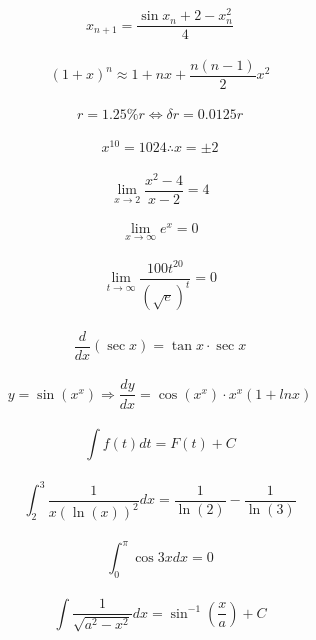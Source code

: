 \documentclass{article} \usepackage{amsmath} \usepackage{amssymb}
\newcommand{\fk}{\frac}
\begin{document}
 
\[x_{n+1}= \frac{\sin x_n + 2 - x_{n}^{2}}{4}\]\\
\[ (1+x)^n\approx1+nx+\frac{n(n-1)}{2}x^2\]\\
\[ r=1.25\%r\Leftrightarrow \delta r = 0.0125r\]\\
\[  x^{10}=1024\therefore x = \pm 2\]\\
\[ \lim_{x\to 2} \fk{x^2-4}{x-2}=4 \]\\
\[ \lim_{x\to \infty} e^x=0\]\\
\[ \lim_{t\to \infty} \frac{100t^{20}}{(\sqrt{e})^t}=0\]\\
\[ \fk{d}{dx}(\sec x)= \tan x \cdot \sec x\]\\
\[ y = \sin (x^x)\Rightarrow \fk{dy}{dx}= \cos (x^x) \cdot x^x (1+ln x)\]\\
\[ \int f(t)dt = F(t) + C\]\\
\[ \int_2^3    \fk{1}{x(\ln(x))^2}dx=\fk{1}{\ln(2)}-\fk{1}{\ln(3)} \]\\
\[ \int_0^\pi \cos 3xdx = 0\]\\
\[ \int \fk{1}{\sqrt{a^2-x^2}}dx=\sin^{-1}\left(\fk{x}{a}\right)+C\]\\
\[ \]\\
\[ \]\\
\[ \]\\
\[ \]\\
\[ \]\\
\[ \]\\
\[ \]\\
\[ \]\\
\[ \]\\
\[ \]\\
\[ \]\\
\[ \]\\
\[ \]\\
\end{document}
